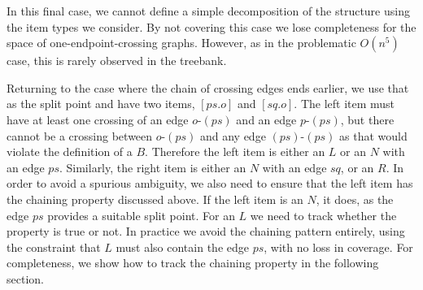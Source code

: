\begin{center}
\end{center}

In this final case, we cannot define a simple decomposition of the structure using the item types we consider.
By not covering this case we lose completeness for the space of one-endpoint-crossing graphs.
However, as in the problematic $O(n^5)$ case, this is rarely observed in the treebank.

Returning to the case where the chain of crossing edges ends earlier, we use that as the split point and have two items, $[ps.o]$ and $[sq.o]$.
The left item must have at least one crossing of an edge $o$-$(ps)$ and an edge $p$-$(ps)$, but there cannot be a crossing between $o$-$(ps)$ and any edge $(ps)$-$(ps)$ as that would violate the definition of a $B$.
Therefore the left item is either an $L$ or an $N$ with an edge $ps$.
Similarly, the right item is either an $N$ with an edge $sq$, or an $R$.
In order to avoid a spurious ambiguity, we also need to ensure that the left item has the chaining property discussed above.
If the left item is an $N$, it does, as the edge $ps$ provides a suitable split point.
For an $L$ we need to track whether the property is true or not.
In practice we avoid the chaining pattern entirely, using the constraint that $L$ must also contain the edge $ps$, with no loss in coverage.
For completeness, we show how to track the chaining property in the following section.

